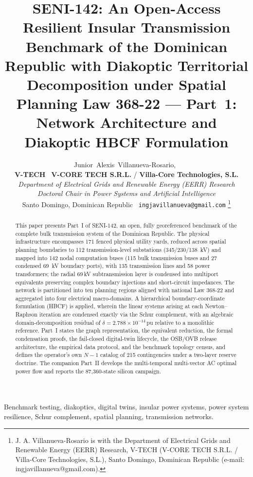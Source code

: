 \documentclass[10pt, journal]{IEEEtran}
\title{SENI-142: An Open-Access Resilient Insular Transmission Benchmark of the Dominican Republic with Diakoptic Territorial Decomposition under Spatial Planning Law 368-22 --- Part~1: Network Architecture and Diakoptic HBCF Formulation}
\author{Junior~Alexis~Villanueva-Rosario,~\IEEEmembership{Ms.C., Ph.D.(c)}\\[0.3em]
{\normalsize\textnormal{\textbf{V-TECH} \textbar\ \textbf{V-CORE TECH S.R.L.} / \textbf{Villa-Core Technologies, S.L.}}}\\[0.15em]
{\footnotesize\textnormal{\textit{Department of Electrical Grids and Renewable Energy (EERR) Research}}}\\[0.15em]
{\footnotesize\textnormal{\textit{Doctoral Chair in Power Systems and Artificial Intelligence}}}\\[0.15em]
{\footnotesize\textnormal{Santo Domingo, Dominican Republic \textbar\ \texttt{ingjavillanueva@gmail.com}}}%
\thanks{J. A. Villanueva-Rosario is with the Department of Electrical Grids and Renewable Energy (EERR) Research, V-TECH (V-CORE TECH S.R.L. / Villa-Core Technologies, S.L.), Santo Domingo, Dominican Republic (e-mail: ingjavillanueva@gmail.com).}}
\begin{document}
\maketitle
\begin{abstract}
This paper presents Part~I of SENI-142, an open, fully georeferenced benchmark of the complete bulk transmission system of the Dominican Republic. The physical infrastructure encompasses 171 fenced physical utility yards, reduced across spatial planning boundaries to 112 transmission-level substations (345/230/138~kV) and mapped into 142 nodal computation buses (115 bulk transmission buses and 27 condensed 69~kV boundary ports), with 135 transmission lines and 58 power transformers; the radial 69\,kV subtransmission layer is condensed into multiport equivalents preserving complex boundary injections and short-circuit impedances. The network is partitioned into ten planning regions aligned with national Law 368-22 and aggregated into four electrical macro-domains. A hierarchical boundary-coordinate formulation (HBCF) is applied, wherein the linear systems arising at each Newton--Raphson iteration are condensed exactly via the Schur complement, with an algebraic domain-decomposition residual of $\delta = 2.788 \times 10^{-14}$\,pu relative to a monolithic reference. Part~I states the graph representation, the equivalent reduction, the formal condensation proofs, the fail-closed digital-twin lifecycle, the OSB/OVB release architecture, the empirical data protocol, and the benchmark topology census, and defines the operator's own $N-1$ catalog of 215 contingencies under a two-layer reserve doctrine. The companion Part~II develops the multi-temporal multi-vector AC optimal power flow and reports the 87,360-state silicon campaign.
\end{abstract}

\begin{IEEEkeywords}
Benchmark testing, diakoptics, digital twins, insular power systems, power system resilience, Schur complement, spatial planning, transmission networks.
\end{IEEEkeywords}

\setlength{\textfloatsep}{12pt plus 2pt minus 4pt}%
\setlength{\dbltextfloatsep}{12pt plus 2pt minus 4pt}%
\setlength{\abovedisplayskip}{7pt plus 2pt minus 3pt}%
\setlength{\belowdisplayskip}{7pt plus 2pt minus 3pt}%
\setlength{\abovedisplayshortskip}{3pt plus 1pt minus 2pt}%
\setlength{\belowdisplayshortskip}{4pt plus 1pt minus 2pt}%
\end{document}

